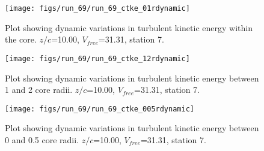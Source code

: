 \begin{figure}[H]
\centering
\texttt{[image: figs/run\_69/run\_69\_ctke\_01rdynamic]}
\caption{Plot showing dynamic variations in turbulent kinetic energy within the core. $z/c$=10.00, $V_{free}$=31.31, station 7.}
\end{figure}


\begin{figure}[H]
\centering
\texttt{[image: figs/run\_69/run\_69\_ctke\_12rdynamic]}
\caption{Plot showing dynamic variations in turbulent kinetic energy between 1 and 2 core radii. $z/c$=10.00, $V_{free}$=31.31, station 7.}
\end{figure}


\begin{figure}[H]
\centering
\texttt{[image: figs/run\_69/run\_69\_ctke\_005rdynamic]}
\caption{Plot showing dynamic variations in turbulent kinetic energy between 0 and 0.5 core radii. $z/c$=10.00, $V_{free}$=31.31, station 7.}
\end{figure}


